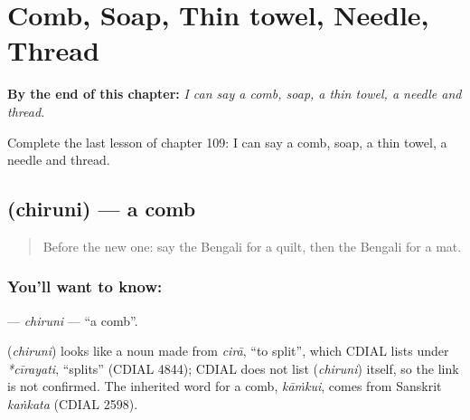 
\chapter{Comb, Soap, Thin towel, Needle, Thread}
\label{ch:bn-comb-soap-thin-towel-needle-thread}

\begin{chapteropening}
\textbf{By the end of this chapter:} \emph{I can say a comb, soap, a thin towel, a needle and thread.}

Complete the last lesson of chapter 109: I can say a comb, soap, a thin towel, a needle and thread.
\end{chapteropening}

\section[\texorpdfstring{\bn{চিরুনি} (chiruni)}{চিরুনি (chiruni)}]{ (chiruni) — a comb}

\label{lesson:BN-C109-chiruni}



\begin{quote}
Before the new one: say the Bengali for a quilt, then the Bengali for a mat.
\end{quote}

\subsection*{You'll want to know: }
\textbf{} — \emph{chiruni} — \textquotedblleft{}a comb\textquotedblright{}.

\begin{cousinweb}
\textbf{} (\emph{chiruni}) looks like a noun made from \emph{cirā}, \textquotedblleft{}to split\textquotedblright{}, which CDIAL lists under \emph{*cīrayati}, \textquotedblleft{}splits\textquotedblright{} (CDIAL 4844); CDIAL does not list \textbf{} (\emph{chiruni}) itself, so the link is not confirmed. The inherited word for a comb, \emph{kāṁkui}, comes from Sanskrit \emph{kaṅkata} (CDIAL 2598).
\end{cousinweb}

